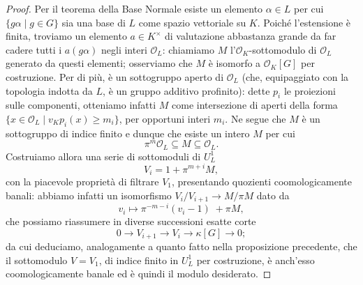 \begin{proof}
	Per il teorema della Base Normale esiste un elemento $ \alpha \in L $ per cui $ \{ g\alpha \mid g \in G \} $ sia una base di $ L $ come spazio vettoriale su $ K $. Poiché l'estensione è finita, troviamo un elemento $ a \in K^\times $ di valutazione abbastanza grande da far cadere tutti i $ a (g\alpha) $ negli interi $ \mathcal{O}_L $: chiamiamo $ M $ l'$ \mathcal{O}_K $-sottomodulo di $ \mathcal{O}_L $ generato da questi elementi; osserviamo che $ M $ è isomorfo a $ \mathcal{O}_K[G] $ per costruzione.  
	Per di più, è un sottogruppo aperto di $ \mathcal{O}_L $ (che, equipaggiato con la topologia indotta da $ L $, è un gruppo additivo profinito): dette $ p_i $ le proiezioni sulle componenti, otteniamo infatti $ M $ come intersezione di aperti della forma $ \{ x \in \mathcal{O}_L \mid v_K p_i (x) \geq m_i\} $, per opportuni interi $ m_i $. Ne segue che $ M $ è un sottogruppo di indice finito e dunque che esiste un intero $ M $ per cui
	\[  \pi^m\mathcal{O}_L\subseteq M \subseteq \mathcal{O}_L. \]
	Costruiamo allora una serie di sottomoduli di $ U_L^1 $
	\[ V_i = 1 + \pi^{m+i}M, \]
	con la piacevole proprietà di filtrare $ V_1 $, presentando quozienti coomologicamente banali: abbiamo infatti un isomorfismo $ V_i/V_{i+1} \to M/\pi M $ dato da $$  v_i \mapsto \pi^{-m-i}(v_i-1) \; +\pi M,  $$ che possiamo riassumere in diverse successioni esatte corte
	\[ 0 \to V_{i+1} \to V_i \to \kappa [G] \to 0; \]
	da cui deduciamo, analogamente a quanto fatto nella proposizione precedente, che il sottomodulo $ V= V_1 $, di indice finito in $ U_L^1 $ per costruzione, è anch'esso coomologicamente banale ed è quindi il modulo desiderato.
\end{proof}

